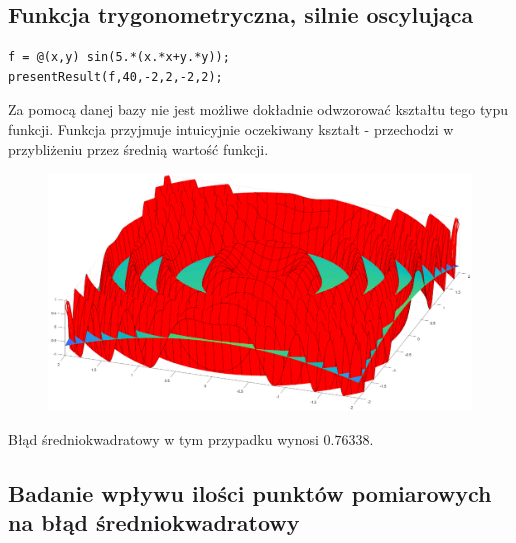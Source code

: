 \documentclass{article}
\begin{document}
\subsection{Funkcja trygonometryczna, silnie oscylująca}
\begin{lstlisting}[style=Matlab-editor]
f = @(x,y) sin(5.*(x.*x+y.*y));
presentResult(f,40,-2,2,-2,2);
\end{lstlisting}
Za pomocą danej bazy nie jest możliwe dokładnie odwzorować kształtu tego typu funkcji. Funkcja przyjmuje intuicyjnie oczekiwany kształt - przechodzi w przybliżeniu przez średnią wartość funkcji.
\begin{figure}[H]
  \includegraphics[width=\linewidth]{fig3.eps}
\end{figure}
Błąd średniokwadratowy w tym przypadku wynosi $0.76338$.
\subsection{Badanie wpływu ilości punktów pomiarowych na błąd średniokwadratowy}
\end{document}
